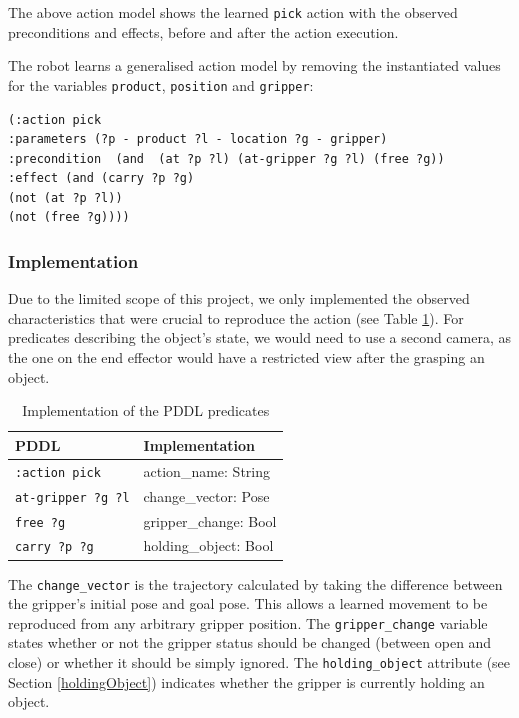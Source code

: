 The above action model shows the learned \texttt{pick} action with the observed preconditions and effects, before and after the action execution.

The robot learns a generalised action model by removing the instantiated values for the variables \texttt{product}, \texttt{position} and \texttt{gripper}:

\begin{verbatim}
(:action pick
:parameters (?p - product ?l - location ?g - gripper)
:precondition  (and  (at ?p ?l) (at-gripper ?g ?l) (free ?g))
:effect (and (carry ?p ?g)
(not (at ?p ?l)) 
(not (free ?g))))
\end{verbatim}

\subsubsection{Implementation}
Due to the limited scope of this project, we only implemented the observed characteristics that were crucial to reproduce the action (see Table \ref{tab:PDDL implementation}).
For predicates describing the object's state, we would need to use a second camera, as the one on the end effector would have a restricted view after the grasping an object.

\begin{table}[h]
	\begin{center}
		\begin{tabular}{l|l}
			PDDL & Implementation\\ \hline
			\texttt{:action pick} & action_name: String\\
			\texttt{at-gripper ?g ?l} & change_vector: Pose\\
			\texttt{free ?g } & gripper_change: Bool\\
			\texttt{carry ?p ?g} & holding_object: Bool
		\end{tabular}
		\label{tab:PDDL implementation}
		\caption{Implementation of the PDDL predicates}
	\end{center}
\end{table}

The \texttt{change_vector} is the trajectory calculated by taking the difference between the gripper's initial pose and goal pose.
This allows a learned movement to be reproduced from any arbitrary gripper position.
The \texttt{gripper_change} variable states whether or not the gripper status should be changed (between open and close) or whether it should be simply ignored.
The \texttt{holding_object} attribute (see Section \ref{holdingObject}) indicates whether the gripper is currently holding an object.

